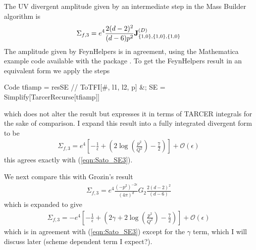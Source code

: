 \documentclass[11pt]{article}
\newcommand{\mb}{\textsf{Mass Builder} }
\begin{document}
The UV divergent amplitude given by an intermediate step in the \mb algorithm is
\begin{align}
\Sigma_{f,3} = e^4 \frac{2(d-2)^2}{(d-6)p^2} \bold{J}_{ \{1,0\}, \{1,0\}, \{1,0\}}^{(D)}
\end{align}
The amplitude given by FeynHelpers is in agreement, using the Mathematica example code available with the package \cite{Shtabovenko}.  To get the FeynHelpers result in an equivalent form we apply the steps
\begin{mmaCell}[functionlocal=y]{Code}
tfiamp = resSE // ToTFI[#, l1, l2, p] &;
SE = Simplify[TarcerRecurse[tfiamp]]
\end{mmaCell}
which does not alter the result but expresses it in terms of TARCER integrals for the sake of comparison.  I expand this result into a fully integrated divergent form to be
\begin{align}
\Sigma_{f,3} = e^4 \left[ -\frac{1}{\epsilon} + \left( 2 \log\left(\frac{p^2}{Q^2}\right)-\frac{7}{2} \right) \right] + \mathcal{O}(\epsilon)
\end{align}
this agrees exactly with (\ref{eqn:Sato_SE3}).

We next compare this with Grozin's result
\begin{align}
\Sigma_{f,3} = e^4 \frac{(-p^2)^{-2\epsilon}}{(4\pi)^d} G_2   \frac{2(d-2)^2}{(d-6)}
\end{align}
which is expanded to give
\begin{align}
\Sigma_{f,3} = -e^4 \left[-\frac{1}{\epsilon} +\left( 2\gamma+2\log\left(\frac{p^2}{Q^2}\right)-\frac{7}{2}\right) \right]+ \mathcal{O}(\epsilon)
\end{align}
which is in agreement with (\ref{eqn:Sato_SE3}) except for the $\gamma$ term, which I will discuss later (scheme dependent term I expect?).
\end{document}
